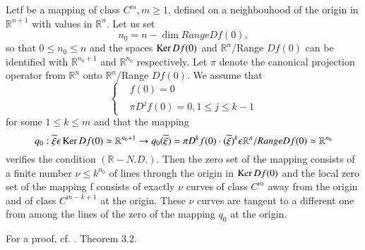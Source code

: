 \begin{comment}\label{chap2-com4.1}
When $k = 1$, the condition $(\mathbb{R}-N.D.)$ amounts to saying that
$Df(0)$ is onto. In particular, $\nu = 1$ and the local zero set of $f$
is made up of exactly one curve of class $C^{m}$ away from the origin
and also $C^{m}$ at the origin: the conclusion is the same as while
using the {\em Implict function theorem.}
\end{comment}

\begin{comment}\label{chap2-com4.2}
Assume now $n = 1$ and $k = 2$. The condition $(\mathbb{R}-N.D.)$ is
the Morse condition and we know that $\nu = 0$ or $\nu = 2$. The
statement is noting but the weak form of the Morse Lemma.
\end{comment}

\begin{comment}\label{chap2-com4.3}
In the same direction see the articles by Magnus \cite{24}, Buchner,
Marsden and Schecter \cite{5} Szulkin \cite{40} among others. Theorem
\ref{chap2-thm4.1} is a particular case of the study made in Rabier
    \cite{29}. More generally, the following extension (which, however, has
    no major application in the nondegenerate cases we shall consider
    in Chapter \ref{chap3}) does not requires $Df(0)$ to vanish. Such
    a result is important in generalizations of the desingularization
    process we shall describe in Chapter \ref{chap5}.
\end{comment}

\begin{theorem}\label{chap2-thm4.2}
Let\pageoriginale f be a mapping of class $C^{m}, m \geq 1$, defined
on a neighbouhood of the origin in $\mathbb{R}^{n+1}$ with values in
$\mathbb{R}^{n}$. Let us set
$$
n_{0} = n - \dim  Range Df(0),
$$
so that $0 \leq n_{0} \leq n$ and the spaces $\operatorname{Ker} Df(0)$ and
$\mathbb{R}^{n}$/Range $Df(0)$ can be identified with
$\mathbb{R}^{n_{0}+1}$ and $\mathbb{R}^{n_{0}}$ respectively. Let
$\pi$ denote the canonical projection operator from $\mathbb{R}^{n}$
onto $\mathbb{R}^{n}$/Range $Df(0)$. We assume that
\begin{equation*}
\begin{cases}
& f(0) = 0\\
& \pi D^{j}f(0) = 0, 1 \leq j \leq k-1
\end{cases}
\end{equation*}
for some $1 \leq k \leq m$ and that the mapping
{\fontsize{10}{12}\selectfont
$$
q_{0} : \widetilde{\xi} \epsilon \operatorname{Ker} Df(0) \simeq \mathbb{R}^{n_{0}+1}
\to q_{0} (\widetilde{\xi}) = \pi D^{k}f(0) \cdot
(\widetilde{\xi})^{k} \epsilon \mathbb{R}^{n} / Range Df(0) \simeq
\mathbb{R}^{n_{0}}
$$}
verifies the condition $(\mathbb{R}-N.D.)$. Then the zero set of the
mapping consists of a finite number $\nu \leq k^{n_{0}}$ of lines
through the origin in $\operatorname{Ker}  Df(0)$ and the local zero set of the
mapping f consists of exactly $\nu$ curves of class $C^{m}$ away from
the origin and of class $C^{m-k+1}$ at the origin. These $\nu$ curves
are tangent to a different one from among the lines of the zero of the
mapping $q_{0}$ at the origin.

For a proof, cf. \cite{29}. Theorem 3.2.
\end{theorem}

